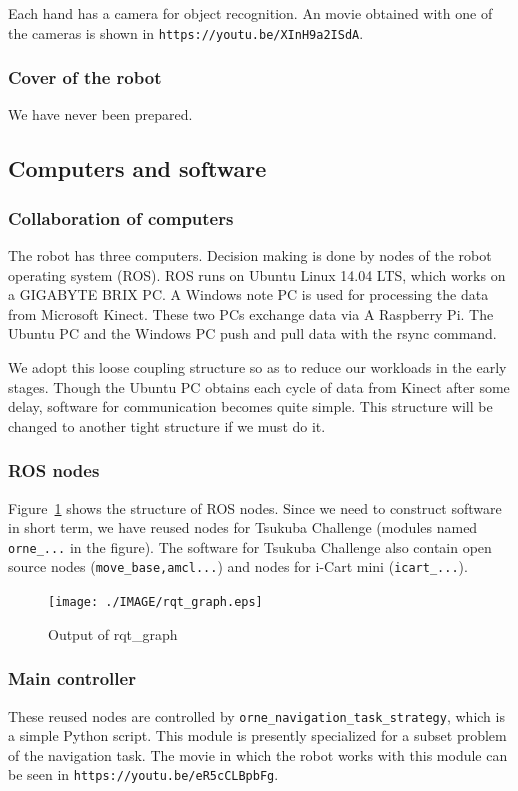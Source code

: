 \documentclass{llncs}
\begin{document}
Each hand has a camera for object recognition.
An movie obtained with one of the cameras is shown in
\texttt{https://youtu.be/XInH9a2ISdA}.


\subsubsection{Cover of the robot} We have never been prepared.

\subsection{Computers and software}

\subsubsection{Collaboration of computers}
The robot has three computers. Decision making is done by
nodes of the robot operating system (ROS).
ROS runs on Ubuntu Linux 14.04 LTS, which works on
a GIGABYTE BRIX PC. A Windows note PC is used for processing
the data from Microsoft Kinect.
These two PCs exchange data via A Raspberry Pi.
The Ubuntu PC and the Windows PC push and pull
data with the rsync command.

We adopt this loose coupling structure
so as to reduce our workloads in the early stages.
Though the Ubuntu PC obtains each cycle of data from Kinect
after some delay, software for communication becomes
quite simple. This structure will be changed to
another tight structure if we must do it.


\subsubsection{ROS nodes}
Figure~\ref{fig:rqt_graph} shows the structure of ROS nodes.
Since we need to construct software in short term, 
we have reused nodes for Tsukuba Challenge (modules named
\texttt{orne\_...} in the figure).
The software for Tsukuba Challenge also contain open source nodes
(\texttt{move\_base,amcl...}) and nodes for i-Cart mini (\texttt{icart\_...}).

\begin{figure}[p]
	\begin{center}
		\texttt{[image: ./IMAGE/rqt\_graph.eps]}
		\caption{Output of rqt\_graph}
		\label{fig:rqt_graph}
	\end{center}
\end{figure}

\subsubsection{Main controller}
These reused nodes are controlled by
\texttt{orne\_navigation\_task\_strategy},
which is a simple Python script.
This module is presently specialized for
a subset problem of the navigation task.
The movie in which the robot works with this module
can be seen in \texttt{https://youtu.be/eR5cCLBpbFg}.
\end{document}
